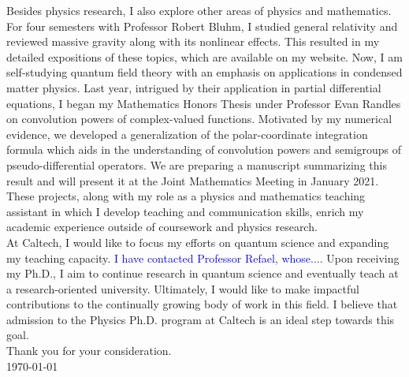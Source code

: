 \documentclass[12pt]{article}
\begin{document}
Besides physics research, I also explore other areas of physics and mathematics. For four semesters with Professor Robert Bluhm, I studied general relativity and reviewed massive gravity along with its nonlinear effects. This resulted in my detailed expositions of these topics, which are available on my website. Now, I am self-studying quantum field theory with an emphasis on applications in condensed matter physics. Last year, intrigued by their application in partial differential equations, I began my Mathematics Honors Thesis under Professor Evan Randles on convolution powers of complex-valued functions. Motivated by my numerical evidence, we developed a generalization of the polar-coordinate integration formula which aids in the understanding of convolution powers and semigroups of pseudo-differential operators. We are preparing a manuscript summarizing this result and will present it at the Joint Mathematics Meeting in January 2021. These projects, along with my role as a physics and mathematics teaching assistant in which I develop teaching and communication skills, enrich my academic experience outside of coursework and physics research.  \\ 

At Caltech, I would like to focus my efforts on quantum science and expanding my teaching capacity. \textcolor{blue}{I have contacted Professor Refael, whose...}. Upon receiving my Ph.D., I aim to continue research in quantum science and eventually teach at a research-oriented university. Ultimately, I would like to make impactful contributions to the continually growing body of work in this field. I believe that admission to the Physics Ph.D. program at Caltech is an ideal step towards this goal. \\

\noindent Thank you for your consideration. \\

\noindent \today
	











	
	
	
	
	
\end{document}
